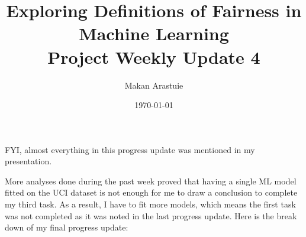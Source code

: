 \documentclass[11pt]{article}
\begin{document}
\title{%
  Exploring Definitions of Fairness in Machine Learning \\ \vspace{5mm}
  \large Project Weekly Update 4}
\author{Makan Arastuie}
\date{\today}
\maketitle


FYI, almost everything in this progress update was mentioned in my presentation.

More analyses  done during the past week proved that having a single ML model fitted on the UCI dataset is not enough for me to draw a conclusion to complete my third task. As a result, I have to fit more models, which means the first task was not completed as it was noted in the last progress update. Here is the break down of my final progress update:
\end{document}

